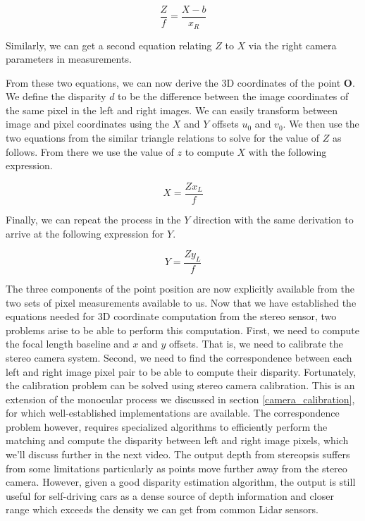 \begin{equation}
\frac{Z}{f} = \frac{X-b}{x_R}
\end{equation}

Similarly, we can get a second equation relating $Z$ to $X$ via the right camera
parameters in measurements. 


From these two equations, we can now derive the 3D coordinates of the point $\mathbf{O}$. We define the disparity $d$ to
be the difference between the image coordinates of the same pixel in the
left and right images. We can easily transform between image and pixel coordinates using the $X$ and $Y$ offsets $u_0$ and $v_0$. We then use
the two equations from the similar triangle relations to solve for the value of $Z$ as follows. From there we use
the value of $z$ to compute $X$ with
the following expression. 

\begin{equation}
X = \frac{Zx_L}{f} 
\end{equation}

Finally, we can repeat the process in
the $Y$  direction with the same derivation to arrive at the following
expression for $Y$. 

\begin{equation}
Y = \frac{Zy_L}{f} 
\end{equation}

The three components of the point position are now explicitly available
from the two sets of pixel measurements available to us. Now that we have established
the equations needed for 3D coordinate computation from the stereo sensor, two problems arise to be able to perform this computation. 
First, we need to compute the focal length baseline and $x$ and $y$ offsets. That is, we need to calibrate
the stereo camera system. Second, we need to find
the correspondence between each left and right
image pixel pair to be able to compute
their disparity. Fortunately, the calibration problem can be solved using stereo
camera calibration. This is an extension of the monocular process we
discussed in section \ref{camera_calibration}, for which well-established
implementations are available. The correspondence
problem however, requires specialized algorithms
to efficiently perform the matching and compute the disparity between left and right image pixels, which we'll discuss
further in the next video. The output depth from stereopsis suffers from some limitations particularly as points move further away
from the stereo camera. However, given a good disparity estimation algorithm, the output is still useful for self-driving cars as a dense
source of depth information and closer range which exceeds the density we can get from common Lidar sensors. 

